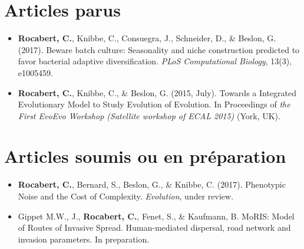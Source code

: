 

\section*{Articles parus}

\begin{itemize}
\item \textbf{Rocabert, C.}, Knibbe, C., Consuegra, J., Schneider, D., \& Beslon, G. (2017). Beware batch culture: Seasonality and niche construction predicted to favor bacterial adaptive diversification. \textit{PLoS Computational Biology}, 13(3), e1005459.
\item \textbf{Rocabert, C.}, Knibbe, C., \& Beslon, G. (2015, July). Towards a Integrated Evolutionary Model to Study Evolution of Evolution. In Proceedings of \textit{the First EvoEvo Workshop (Satellite workshop of ECAL 2015)} (York, UK).
\end{itemize}

\section*{Articles soumis ou en pr\'eparation}
\begin{itemize}
\item \textbf{Rocabert, C.}, Bernard, S., Beslon, G., \& Knibbe, C. (2017). Phenotypic Noise and the Cost of Complexity. \textit{Evolution}, under review.
\item Gippet M.W., J., \textbf{Rocabert, C.}, Fenet, S., \& Kaufmann, B. MoRIS: Model of Routes of Invasive Spread. Human-mediated dispersal, road network and invasion parameters. In preparation.
\end{itemize}

